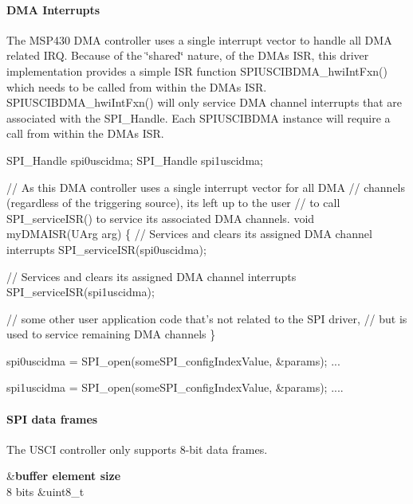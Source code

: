 \paragraph*{D\+M\+A Interrupts}

The M\+S\+P430 D\+M\+A controller uses a single interrupt vector to handle all D\+M\+A related I\+R\+Q. Because of the \char`\"{}shared\char`\"{} nature, of the D\+M\+A\textquotesingle{}s I\+S\+R, this driver implementation provides a simple I\+S\+R function S\+P\+I\+U\+S\+C\+I\+B\+D\+M\+A\+\_\+hwi\+Int\+Fxn() which needs to be called from within the D\+M\+A\textquotesingle{}s I\+S\+R. S\+P\+I\+U\+S\+C\+I\+B\+D\+M\+A\+\_\+hwi\+Int\+Fxn() will only service D\+M\+A channel interrupts that are associated with the S\+P\+I\+\_\+\+Handle. Each S\+P\+I\+U\+S\+C\+I\+B\+D\+M\+A instance will require a call from within the D\+M\+A\textquotesingle{}s I\+S\+R.


\begin{DoxyCode}
SPI_Handle spi0uscidma;
SPI_Handle spi1uscidma;

\textcolor{comment}{// As this DMA controller uses a single interrupt vector for all DMA}
\textcolor{comment}{// channels (regardless of the triggering source), its left up to the user}
\textcolor{comment}{// to call SPI\_serviceISR() to service its associated DMA channels.}
\textcolor{keywordtype}{void} myDMAISR(UArg arg)
\{
    \textcolor{comment}{// Services and clears its assigned DMA channel interrupts}
    SPI_serviceISR(spi0uscidma);

    \textcolor{comment}{// Services and clears its assigned DMA channel interrupts}
    SPI_serviceISR(spi1uscidma);

    \textcolor{comment}{// some other user application code that's not related to the SPI driver,}
    \textcolor{comment}{// but is used to service remaining DMA channels}
\}

spi0uscidma = SPI_open(someSPI\_configIndexValue, &params);
...

spi1uscidma = SPI_open(someSPI\_configIndexValue, &params);
....
\end{DoxyCode}


\paragraph*{S\+P\+I data frames}

The U\+S\+C\+I controller only supports 8-\/bit data frames.

\begin{TabularC}{2}
\hline
{}&{\bf buffer element size  }\\
8 bits &uint8\+\_\+t \\
\end{TabularC}

